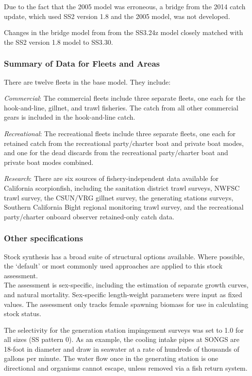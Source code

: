 \documentclass[12pt,]{article}
\begin{document}
Due to the fact that the 2005 model was erroneous, a bridge from the
2014 catch update, which used SS2 version 1.8 and the 2005 model, was
not developed.

Changes in the bridge model from from the SS3.24z model closely matched
with the SS2 version 1.8 model to SS3.30.

\subsubsection{Summary of Data for Fleets and
Areas}\label{summary-of-data-for-fleets-and-areas}

There are twelve fleets in the base model. They include:

\emph{Commercial}: The commercial fleets include three separate fleets,
one each for the hook-and-line, gillnet, and trawl fisheries. The catch
from all other commercial gears is included in the hook-and-line catch.

\emph{Recreational}: The recreational fleets include three separate
fleets, one each for retained catch from the recreational party/charter
boat and private boat modes, and one for the dead discards from the
recreational party/charter boat and private boat modes combined.

\emph{Research}: There are six sources of fishery-independent data
available for California scorpionfish, including the sanitation district
trawl surveys, NWFSC trawl survey, the CSUN/VRG gillnet survey, the
generating stations surveys, Southern California Bight regional
monitoring trawl survey, and the recreational party/charter onboard
observer retained-only catch data.

\subsubsection{Other specifications}\label{other-specifications}

Stock synthesis has a broad suite of structural options available. Where
possible, the `default' or most commonly used approaches are applied to
this stock assessment.\\
The assessment is sex-specific, including the estimation of separate
growth curves, and natural mortality. Sex-specific length-weight
parameters were input as fixed values. The assessment only tracks female
spawning biomass for use in calculating stock status.

The selectivity for the generation station impingement surveys was set
to 1.0 for all sizes (SS pattern 0). As an example, the cooling intake
pipes at SONGS are 18-foot in diameter and draw in seawater at a rate of
hundreds of thousands of gallons per minute. The water flow once in the
generating station is one directional and organisms cannot escape,
unless removed via a fish return system.
\end{document}
